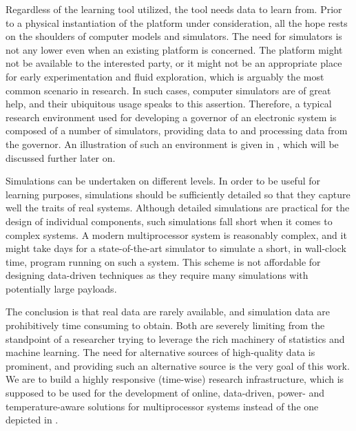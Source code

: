 
Regardless of the learning tool utilized, the tool needs data to learn from.
Prior to a physical instantiation of the platform under consideration, all the
hope rests on the shoulders of computer models and simulators. The need for
simulators is not any lower even when an existing platform is concerned. The
platform might not be available to the interested party, or it might not be an
appropriate place for early experimentation and fluid exploration, which is
arguably the most common scenario in research. In such cases, computer
simulators are of great help, and their ubiquitous usage speaks to this
assertion. Therefore, a typical research environment used for developing a
governor of an electronic system is composed of a number of simulators,
providing data to and processing data from the governor. An illustration of such
an environment is given in , which will be discussed further
later on.

Simulations can be undertaken on different levels. In order to be useful for
learning purposes, simulations should be sufficiently detailed so that they
capture well the traits of real systems. Although detailed simulations are
practical for the design of individual components, such simulations fall short
when it comes to complex systems. A modern multiprocessor system is reasonably
complex, and it might take days for a state-of-the-art simulator to simulate a
short, in wall-clock time, program running on such a system. This scheme is not
affordable for designing data-driven techniques as they require many simulations
with potentially large payloads.

The conclusion is that real data are rarely available, and simulation data are
prohibitively time consuming to obtain. Both are severely limiting from the
standpoint of a researcher trying to leverage the rich machinery of statistics
and machine learning. The need for alternative sources of high-quality data is
prominent, and providing such an alternative source is the very goal of this
work. We are to build a highly responsive (time-wise) research infrastructure,
which is supposed to be used for the development of online, data-driven, power-
and temperature-aware solutions for multiprocessor systems instead of the one
depicted in .
